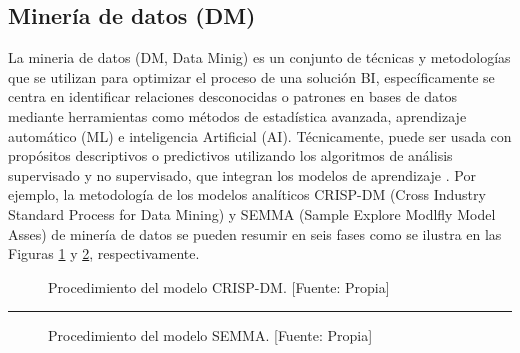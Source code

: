 \documentclass[11pt,titlepage]{report}
\begin{document}
\subsection{Minería de datos (DM)}
La mineria de datos (DM, Data Minig) es un conjunto de técnicas y metodologías que se utilizan para optimizar el proceso de una solución BI, específicamente se centra en identificar relaciones desconocidas o patrones en bases de datos mediante herramientas como métodos de estadística avanzada, aprendizaje automático (ML) e inteligencia Artificial (AI). Técnicamente, puede ser usada con propósitos descriptivos o predictivos utilizando los algoritmos de análisis supervisado y no supervisado, que integran los modelos de aprendizaje \cite{lib02}. Por ejemplo, la metodología de los modelos analíticos CRISP-DM (Cross Industry Standard Process for Data Mining) y SEMMA (Sample Explore Modlfly Model Asses) de minería de datos se pueden resumir en seis fases como se ilustra en las Figuras \ref{fig: CRISP} y \ref{fig: SEMMA}, respectivamente.

\begin{figure}[h]
\centering
{}
\caption{Procedimiento del modelo CRISP-DM. [Fuente: Propia]} \label{fig: CRISP}	
\end{figure} 

\hrule
\begin{figure}[h]
\centering
{}
\caption{Procedimiento del modelo SEMMA. [Fuente: Propia]} \label{fig: SEMMA}	
\end{figure} 
\end{document}
